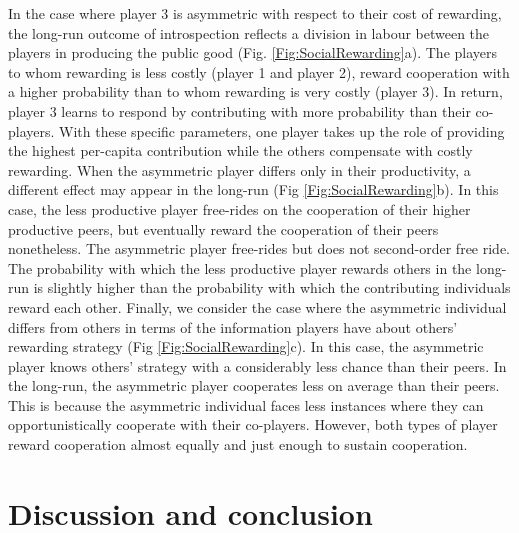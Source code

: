 \documentclass[11pt]{article}
\theoremstyle{plainCl1}
\theoremstyle{plainCl2}
\begin{document}
\noindent In the case where player 3 is asymmetric with respect to their cost of rewarding, the long-run outcome of introspection reflects a division in labour between the players in producing the public good (Fig. \ref{Fig:SocialRewarding}a). The players to whom rewarding is less costly (player 1 and player 2), reward cooperation with a higher probability than to whom rewarding is very costly (player 3). In return, player 3 learns to respond by contributing with more probability than their co-players. With these specific parameters, one player takes up the role of providing the highest per-capita contribution while the others compensate with costly rewarding. When the asymmetric player differs only in their productivity, a different effect may appear in the long-run (Fig \ref{Fig:SocialRewarding}b). In this case, the less productive player free-rides on the cooperation of their higher productive peers, but eventually reward the cooperation of their peers nonetheless. The asymmetric player free-rides but does not second-order free ride. The probability with which the less productive player rewards others in the long-run is slightly higher than the probability with which the contributing individuals reward each other. Finally, we consider the case where the asymmetric individual differs from others in terms of the information players have about others' rewarding strategy (Fig \ref{Fig:SocialRewarding}c). In this case, the asymmetric player knows others' strategy with a considerably less chance than their peers. In the long-run, the asymmetric player cooperates less on average than their peers. This is because the asymmetric individual faces less instances where they can opportunistically cooperate with their co-players. However, both types of player reward cooperation almost equally and just enough to sustain cooperation. 

\section{Discussion and conclusion}

\end{document}
